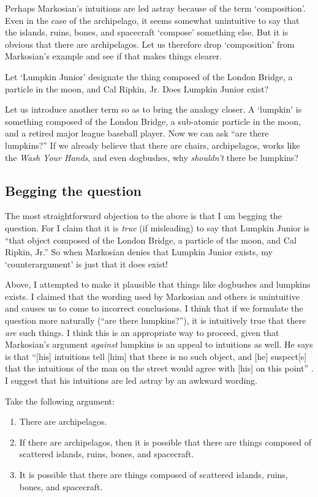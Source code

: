 \documentclass[11pt]{article}
\begin{document}
\begin{spacing}{1.25}
Perhaps Markosian's intuitions are led astray because of the term
`composition'.  Even in the case of the archipelago, it seems somewhat
unintuitive to say that the islands, ruins, bones, and spacecraft
`compose' something else.  But it is obvious that there are
archipelagos.  Let us therefore drop `composition' from Markosian's
example and see if that makes things clearer.

Let `Lumpkin Junior' designate the thing composed of the London
Bridge, a particle in the moon, and Cal Ripkin, Jr.  Does Lumpkin
Junior exist?

Let us introduce another term so as to bring the analogy closer.  A
`lumpkin' is something composed of the London Bridge, a sub-atomic
particle in the moon, and a retired major league baseball player.  Now
we can ask ``are there lumpkins?''  If we already believe that there
are chairs, archipelagos, works like the {\em Wash Your Hands}, and
even dogbushes, why {\em shouldn't} there be lumpkins?

\subsection{Begging the question}
\label{beg}
The most straightforward objection to the above is that I am begging
the question.  For I claim that it is {\em true} (if misleading) to
say that Lumpkin Junior is ``that object composed of the London
Bridge, a particle of the moon, and Cal Ripkin, Jr.''  So when
Markosian denies that Lumpkin Junior exists, my `counterargument' is
just that it does exist!

Above, I attempted to make it plausible that things like dogbushes and
lumpkins exists.  I claimed that the wording used by Markosian and
others is unintuitive and causes us to come to incorrect conclusions.
I think that if we formulate the question more naturally (``are there
lumpkins?''), it is intuitively true that there {\em are} such things.
I think this is an appropriate way to proceed, given that Markosian's
argument {\em against} lumpkins is an appeal to intuitions as well.
He says is that ``[his] intuitions tell [him] that there is no such
object, and [he] suspect[s] that the intuitions of the man on the
street would agree with [his] on this point''
\citeyearpar[228]{markosian1998a}.  I suggest that his intuitions are
led astray by an awkward wording.

Take the following argument:

\begin{enumerate}
  \item There are archipelagos.
  \item If there are archipelagos, then it is possible that there are
    things composed of scattered islands, ruins, bones, and
    spacecraft.
  \item It is possible that there are things composed of scattered
    islands, ruins, bones, and spacecraft.
\end{enumerate}


\end{spacing}
\end{document}
